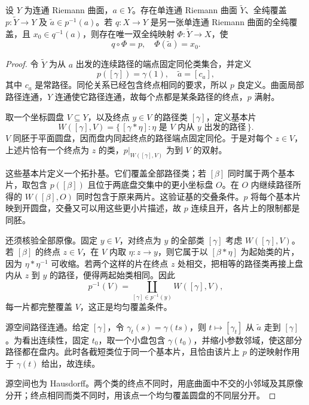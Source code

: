 \begin{theorem}[万有覆盖]\label{b3:thm:11-universal-cover}
设 \(Y\) 为连通 Riemann 曲面，\(a\in Y\)。存在单连通 Riemann 曲面 \(\widetilde Y\)、全纯覆盖 \(p:\widetilde Y\rightarrow Y\) 及 \(\widetilde a\in p^{-1}(a)\)。若 \(q:X\rightarrow Y\) 是另一张单连通 Riemann 曲面的全纯覆盖，且 \(x_0\in q^{-1}(a)\)，则存在唯一双全纯映射 \(\Phi:\widetilde Y\rightarrow X\)，使
\[
 q\circ\Phi=p,\quad \Phi(\widetilde a)=x_0.
\]
\end{theorem}
\begin{proof}
令 \(\widetilde Y\) 为从 \(a\) 出发的连续路径的端点固定同伦类集合，并定义
\[
 p([\gamma])=\gamma(1),\quad \widetilde a=[c_a],
\]
其中 \(c_a\) 是常路径。同伦关系已经包含终点相同的要求，所以 \(p\) 良定义。曲面局部路径连通，\(Y\) 连通使它路径连通，故每个点都是某条路径的终点，\(p\) 满射。

取一个坐标圆盘 \(V\subseteq Y\)，以及终点 \(y\in V\) 的路径类 \([\gamma]\)，定义基本片
\[
 W([\gamma],V)
 =\{\,[\gamma*\eta]:\eta\text{ 是 }V\text{ 内从 }y
                 \text{ 出发的路径}\,\}.
\]
\(V\) 同胚于平面圆盘，因而盘内同起终点的路径端点固定同伦。于是对每个 \(z\in V\)，上述片恰有一个终点为 \(z\) 的类，\(p|_{W([\gamma],V)}\) 为到 \(V\) 的双射。

这些基本片定义一个拓扑基。它们覆盖全部路径类；若 \([\beta]\) 同时属于两个基本片，取包含 \(p([\beta])\) 且位于两底盘交集中的更小坐标盘 \(O\)。在 \(O\) 内继续路径所得的 \(W([\beta],O)\) 同时包含于原来两片。这验证基的交叠条件。\(p\) 将每个基本片映到开圆盘，交叠又可以用这些更小片描述，故 \(p\) 连续且开，各片上的限制都是同胚。

还须核验全部原像。固定 \(y\in V\)，对终点为 \(y\) 的全部类 \([\gamma]\) 考虑 \(W([\gamma],V)\)。若 \([\beta]\) 的终点 \(z\in V\)，在 \(V\) 内取 \(\eta:z\rightarrow y\)，则它属于以 \([\beta*\eta]\) 为起始类的片，因为 \(\eta*\eta^{-1}\) 可收缩。若两个这样的片在终点 \(z\) 处相交，把相等的路径类再接上盘内从 \(z\) 到 \(y\) 的路径，便得两起始类相同。因此
\[
 p^{-1}(V)=\coprod_{[\gamma]\in p^{-1}(y)}W([\gamma],V),
\]
每一片都完整覆盖 \(V\)，这正是均匀覆盖条件。

源空间路径连通。给定 \([\gamma]\)，令 \(\gamma_t(s)=\gamma(ts)\)，则 \(t\mapsto[\gamma_t]\) 从 \(\widetilde a\) 走到 \([\gamma]\)。为看出连续性，固定 \(t_0\)，取一个小盘包含 \(\gamma(t_0)\)，并缩小参数邻域，使这部分路径都在盘内。此时各截短类位于同一个基本片，且恰由该片上 \(p\) 的逆映射作用于 \(\gamma(t)\) 给出，故连续。

源空间也为 Hausdorff。两个类的终点不同时，用底曲面中不交的小邻域及其原像分开；终点相同而类不同时，用该点一个均匀覆盖圆盘的不同层分开。


\end{proof}
